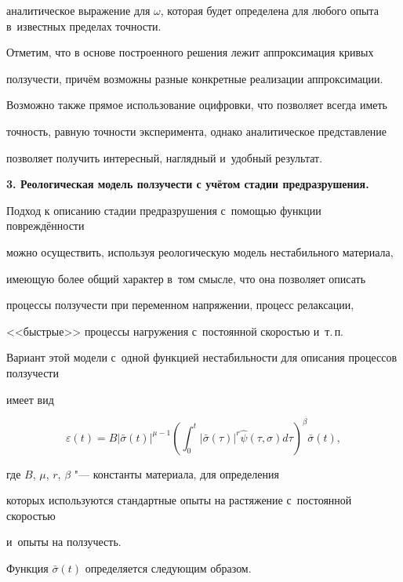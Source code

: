 аналитическое выражение для $\omega $, которая будет определена для любого опыта в~известных пределах точности.



Отметим, что в основе построенного решения лежит аппроксимация кривых

ползучести, причём возможны разные конкретные реализации аппроксимации.

Возможно также прямое использование оцифровки, что позволяет всегда иметь

точность, равную точности эксперимента, однако аналитическое представление

позволяет получить интересный, наглядный и~удобный результат.



\textbf{3. Реологическая модель ползучести с учётом стадии предразрушения.}

Подход к описанию стадии предразрушения с~помощью функции повреждённости

можно осуществить, используя реологическую модель нестабильного материала,

имеющую более общий характер в~том смысле, что она позволяет описать

процессы ползучести при переменном напряжении, процесс релаксации,

<<быстрые>> процессы нагружения с~постоянной скоростью и~т.\,п.

Вариант этой модели с~одной функцией нестабильности для описания процессов ползучести

имеет вид

\begin{equation}

\label{agahi-eq5}

\varepsilon (t)=B\left| {\bar {\sigma }(t)} \right|^{\mu -1}\left(

{\int_0^t {\left| {\bar {\sigma }(\tau )} \right|^r\hat {\psi }(\tau

,\sigma )d\tau } } \right)^\beta \bar {\sigma }(t),

\end{equation}

где $B$, $\mu$, $r$, $\beta $ "--- константы материала, для определения

которых используются стандартные опыты на растяжение с~постоянной скоростью

и~опыты на ползучесть.



Функция $\bar {\sigma }(t)$ определяется следующим образом.

